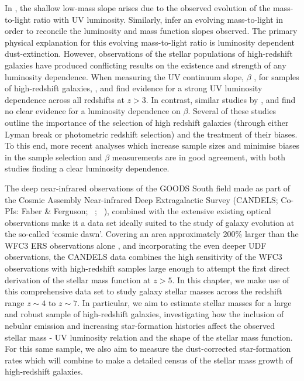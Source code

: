 In \citet{Gonzalez:2011dn}, the shallow low-mass slope arises due to the observed evolution of the mass-to-light ratio with UV luminosity. Similarly, \citet{2012ApJ...752...66L} infer an evolving mass-to-light in order to reconcile the luminosity and mass function slopes observed. The primary physical explanation for this evolving mass-to-light ratio is luminosity dependent dust-extinction. However, observations of the stellar populations of high-redshift galaxies have produced conflicting results on the existence and strength of any luminosity dependence. When measuring the UV continuum slope, $\beta$ \citep{1994ApJ...429..582C}, for samples of high-redshift galaxies, \citet{Wilkins:2011fs}, \citet{2012ApJ...754...83B} and \citet{Bouwens:2013vf} find evidence for a strong UV luminosity dependence across all redshifts at $z > 3$. In contrast, similar studies by \citet{Dunlop:2011jl}, \citet{2012ApJ...756..164F} and \citet{2013MNRAS.429.2456R} find no clear evidence for a luminosity dependence on $\beta$. Several of these studies outline the importance of the selection of high redshift galaxies (through either Lyman break or photometric redshift selection) and the treatment of their biases. To this end, more recent analyses \citep{Bouwens:2013vf,Rogers:2014bn} which increase sample sizes and minimise biases in the sample selection and $\beta$ measurements are in good agreement, with both studies finding a clear luminosity dependence.

The deep near-infrared observations of the GOODS South field made as part of the Cosmic Assembly Near-infrared Deep Extragalactic Survey (CANDELS; Co-PIs: Faber \& Ferguson; \citeauthor{2011ApJS..197...35G}~\citeyear{2011ApJS..197...35G}; \citeauthor{Koekemoer:2011br}~\citeyear{Koekemoer:2011br}), combined with the extensive existing optical observations make it a data set ideally suited to the study of galaxy evolution at the so-called `cosmic dawn'. Covering an area approximately 200\% larger than the WFC3 ERS observations alone \citep{2011ApJS..193...27W}, and incorporating the even deeper UDF observations, the CANDELS data combines the high sensitivity of the WFC3 observations with high-redshift samples large enough to attempt the first direct derivation of the stellar mass function at $z > 5$. In this chapter, we make use of this comprehensive data set to study galaxy stellar masses across the redshift range $z \sim 4$ to $z \sim 7$. In particular, we aim to estimate stellar masses for a large and robust sample of high-redshift galaxies, investigating how the inclusion of nebular emission and increasing star-formation histories affect the observed stellar mass - UV luminosity relation and the shape of the stellar mass function. For this same sample, we also aim to measure the dust-corrected star-formation rates which will combine to make a detailed census of the stellar mass growth of high-redshift galaxies. 

